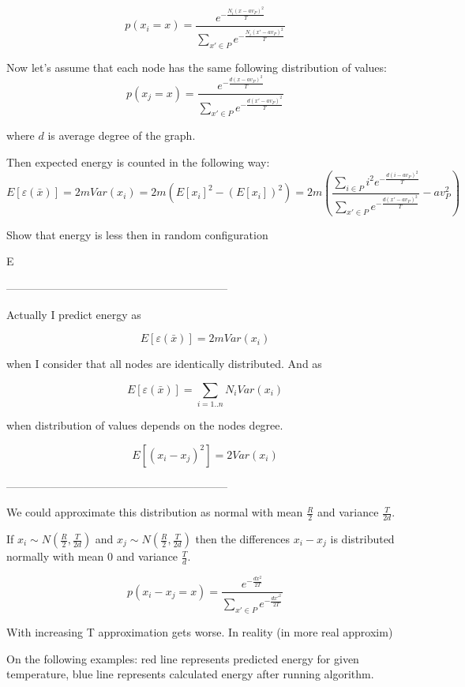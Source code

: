 \documentclass[12pt]{report}
\begin{document}
$$ p(x_i = x) = 
\frac{ e^{-\frac{N_i(x - av_P)^2}{T}} }{ \sum\limits_{x'\in P} e^{-\frac{N_i(x' - av_P)^2}{T}}}$$


Now let's assume that each node has the same following distribution of values:
$$ p(x_j = x) = 
\frac{ e^{-\frac{d(x - av_P)^2}{T}} }{ \sum\limits_{x'\in P} e^{-\frac{d(x' - av_P)^2}{T}}}$$

where $d$ is average degree of the graph. 

Then expected energy is counted in the following way:
$$ E[\varepsilon (\bar{x})] = 2mVar(x_i) = 2m\left(E[x_i]^2 - (E[x_i])^2\right) = 2m\left(\frac{ \sum\limits_{i\in P} i^2 e^{- \frac{d(i - av_P)^2}{T}} }{ \sum\limits_{x'\in P} e^{-\frac{d(x' - av_P)^2}{T}}} - av_P^2\right)$$

Show that energy is less then in random configuration 

E


------------------------------------------------------------

Actually I predict energy as

$$ E[\varepsilon (\bar{x})] = 2mVar(x_i)$$

when I consider that all nodes are identically distributed. And as

$$ E[\varepsilon (\bar{x})] =  \sum\limits_{i=1..n} N_iVar(x_i)$$

when distribution of values depends on the nodes degree.




$$ E[(x_i - x_j)^2] = 2Var(x_i)$$

------------------------------------------------------------

We could approximate this distribution as normal with mean $\frac{R}{2}$ and variance $\frac{T}{2d}$.

If $x_i \sim N(\frac{R}{2}, \frac{T}{2d})$ and $x_j \sim N(\frac{R}{2}, \frac{T}{2d})$ then the differences $x_i-x_j$ is distributed normally with mean 0 and variance
$\frac{T}{d}$.

$$ p(x_i - x_j = x) = 
\frac{ e^{-\frac{dx^2}{2T}} }{ \sum\limits_{x'\in P} e^{-\frac{dx'^2}{2T}}}$$

With increasing T approximation gets worse. In reality (in more real approxim)  

On the following examples: red line represents predicted energy for given temperature, blue line represents calculated energy after running algorithm. 
\end{document}
